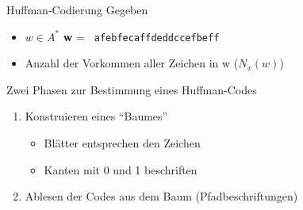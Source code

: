 \documentclass[handout]{beamer}
\begin{document}
\begin{frame}{Huffman-Codierung}
Gegeben
\begin{itemize}
\item $w \in A^*$ 
\textbf{w } = \texttt{ afebfecaffdeddccefbeff }
\pause
\item Anzahl der Vorkommen aller Zeichen in w ($N_x(w)$)
\end{itemize}		
\pause
Zwei Phasen zur Bestimmung eines Huffman-Codes
\begin{enumerate}
\item Konstruieren eines ``Baumes''
\begin{itemize}
\item Blätter entsprechen den Zeichen
\item Kanten mit 0 und 1 beschriften\\ 
\end{itemize} 
\pause
\item Ablesen der Codes aus dem Baum (Pfadbeschriftungen)
\end{enumerate}
\end{frame}
\end{document}
